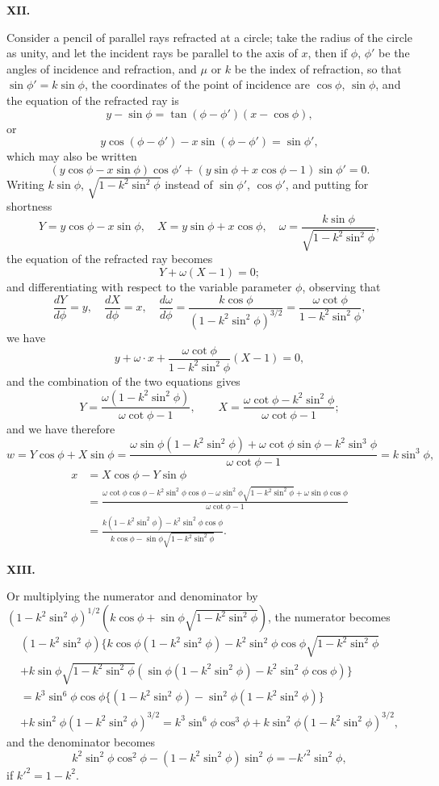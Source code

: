 \documentclass[11pt,a4paper]{article}
\begin{document}
\clearpage
\noindent\textbf{XII.}

Consider a pencil of parallel rays refracted at a circle; take the radius of
the circle as unity, and let the incident rays be parallel to the axis of $x$, then if
$\phi$, $\phi'$ be the angles of incidence and refraction, and $\mu$ or $k$ be the index of
refraction, so that $\sin\phi' = k\sin\phi$, the coordinates of the point of incidence are
$\cos\phi$, $\sin\phi$, and the equation of the refracted ray is
\[y - \sin\phi = \tan(\phi - \phi')(x - \cos\phi),\]
or
\[y\cos(\phi - \phi') - x\sin(\phi - \phi') = \sin\phi',\]
which may also be written
\[(y\cos\phi - x\sin\phi)\cos\phi' + (y\sin\phi + x\cos\phi - 1)\sin\phi' = 0.\]
Writing $k\sin\phi$, $\sqrt{1-k^2\sin^2\phi}$ instead of $\sin\phi'$, $\cos\phi'$, and putting for
shortness
\[Y = y\cos\phi - x\sin\phi,\quad X = y\sin\phi + x\cos\phi,\quad
\omega = \frac{k\sin\phi}{\sqrt{1-k^2\sin^2\phi}},\]
the equation of the refracted ray becomes
\[Y + \omega(X-1) = 0;\]
and differentiating with respect to the variable parameter $\phi$, observing that
\[\frac{dY}{d\phi} = y,\quad \frac{dX}{d\phi} = x,\quad
\frac{d\omega}{d\phi} = \frac{k\cos\phi}{(1-k^2\sin^2\phi)^{3/2}} = \frac{\omega\cot\phi}{1-k^2\sin^2\phi},\]
we have
\[y + \omega\cdot x + \frac{\omega\cot\phi}{1-k^2\sin^2\phi}(X-1) = 0,\]
and the combination of the two equations gives
\[Y = \frac{\omega(1-k^2\sin^2\phi)}{\omega\cot\phi - 1},\qquad
X = \frac{\omega\cot\phi - k^2\sin^2\phi}{\omega\cot\phi - 1};\]
and we have therefore
\[w = Y\cos\phi + X\sin\phi = \frac{\omega\sin\phi(1-k^2\sin^2\phi) + \omega\cot\phi\sin\phi - k^2\sin^3\phi}{\omega\cot\phi - 1} = k\sin^3\phi,\]
\begin{align*}
x &= X\cos\phi - Y\sin\phi\\
&= \frac{\omega\cot\phi\cos\phi - k^2\sin^2\phi\cos\phi - \omega\sin^2\phi\sqrt{1-k^2\sin^2\phi} + \omega\sin\phi\cos\phi}{\omega\cot\phi - 1}\\
&= \frac{k(1-k^2\sin^2\phi) - k^2\sin^2\phi\cos\phi}{k\cos\phi - \sin\phi\sqrt{1-k^2\sin^2\phi}}.
\end{align*}

\noindent\textbf{XIII.}

Or multiplying the numerator and denominator by $(1-k^2\sin^2\phi)^{1/2}(k\cos\phi + \sin\phi\sqrt{1-k^2\sin^2\phi})$, the numerator becomes
\begin{multline*}
(1-k^2\sin^2\phi)\{k\cos\phi(1-k^2\sin^2\phi) - k^2\sin^2\phi\cos\phi\sqrt{1-k^2\sin^2\phi}\\
+ k\sin\phi\sqrt{1-k^2\sin^2\phi}(\sin\phi(1-k^2\sin^2\phi) - k^2\sin^2\phi\cos\phi)\}\\
= k^3\sin^6\phi\cos\phi\{(1-k^2\sin^2\phi) - \sin^2\phi(1-k^2\sin^2\phi)\}\\
+ k\sin^2\phi(1-k^2\sin^2\phi)^{3/2} = k^3\sin^6\phi\cos^3\phi + k\sin^2\phi(1-k^2\sin^2\phi)^{3/2},
\end{multline*}
and the denominator becomes
\[k^2\sin^2\phi\cos^2\phi - (1-k^2\sin^2\phi)\sin^2\phi = -k'^2\sin^2\phi,\]
if $k'^2 = 1-k^2$.
\end{document}
